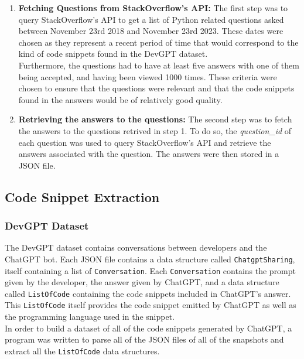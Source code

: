 \begin{enumerate}
    \item \textbf{Fetching Questions from StackOverflow's API:} The first step was to query StackOverflow's API to get a list of Python related questions asked between November 23rd 2018 and November 23rd 2023. These dates were chosen as they represent a recent period of time that would correspond to the kind of code snippets found in the DevGPT dataset. \\

          Furthermore, the questions had to have at least five answers with one of them being accepted, and having been viewed 1000 times. These criteria were chosen to ensure that the questions were relevant and that the code snippets found in the answers would be of relatively good quality.\\

    \item \textbf{Retrieving the answers to the questions:} The second step was to fetch the answers to the questions retrived in step 1. To do so, the \textit{question\_id} of each question was used to query StackOverflow's API and retrieve the answers associated with the question. The answers were then stored in a JSON file.

\end{enumerate}

\subsection{Code Snippet Extraction}
\subsubsection{DevGPT Dataset}
The DevGPT dataset contains conversations between developers and the ChatGPT bot. Each JSON file contains a data structure called \texttt{ChatgptSharing}, itself containing a list of \texttt{Conversation}. Each \texttt{Conversation} contains the prompt given by the developer, the answer given by ChatGPT, and a data structure called \texttt{ListOfCode} containing the code snippets included in ChatGPT's answer. \\

This \texttt{ListOfCode} itself provides the code snippet emitted by ChatGPT as well as the programming language used in the snippet. \\

In order to build a dataset of all of the code snippets generated by ChatGPT, a program was written to parse all of the JSON files of all of the snapshots and extract all the \texttt{ListOfCode} data structures. \\

